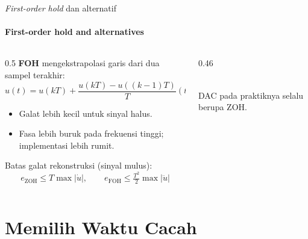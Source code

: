 \documentclass[aspectratio=169,10pt]{beamer}
\begin{document}
\begin{frame}{\textit{First-order hold} dan alternatif}
	\framesubtitle{First-order hold and alternatives}
	\begin{columns}[T]
		\begin{column}{0.5\textwidth}
			\small
			\textbf{FOH} mengekstrapolasi garis dari dua sampel terakhir:
			\[
				u(t) = u(kT) + \frac{u(kT)-u((k-1)T)}{T}(t-kT)
			\]
			\begin{itemize}
				\item Galat lebih kecil untuk sinyal halus.
				\item Fasa lebih buruk pada frekuensi tinggi; implementasi lebih rumit.
			\end{itemize}
			\vspace{0.1cm}
			Batas galat rekonstruksi (sinyal mulus):
			\[
				e_{\text{ZOH}} \le T\max|\dot u|,\qquad e_{\text{FOH}} \le \tfrac{T^2}{2}\max|\ddot u|
			\]
		\end{column}
		\begin{column}{0.46\textwidth}
			\centering
			\\
			{\scriptsize DAC pada praktiknya selalu berupa ZOH.}
		\end{column}
	\end{columns}
\end{frame}

\section{Memilih Waktu Cacah\texorpdfstring{\\[4pt]{\Large{}}}{ / Choosing the Sampling Period}}
\end{document}
